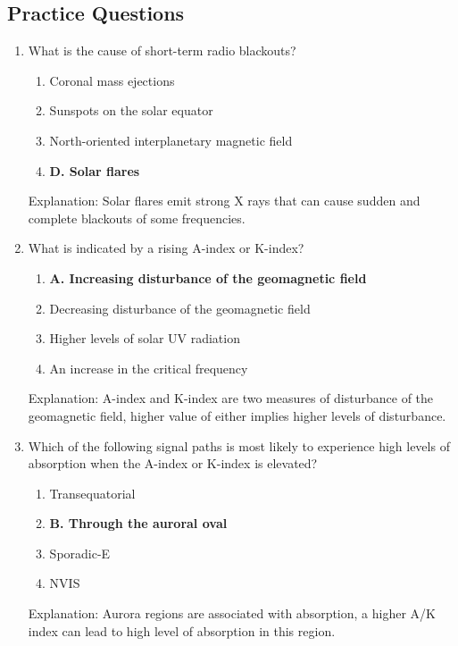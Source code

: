 \subsection*{Practice Questions}
\begin{enumerate}
    \item What is the cause of short-term radio blackouts?
        \begin{enumerate}
          \item  Coronal mass ejections
       \item  Sunspots on the solar equator
      \item  North-oriented interplanetary magnetic field
         \item \textbf{D. Solar flares}
     \end{enumerate}
    \textcolor{myred}{Explanation:}
     Solar flares emit strong X rays that can cause sudden and complete blackouts of some frequencies.
     
   \item What is indicated by a rising A-index or K-index?
         \begin{enumerate}
        \item \textbf{A. Increasing disturbance of the geomagnetic field}
        \item  Decreasing disturbance of the geomagnetic field
       \item  Higher levels of solar UV radiation
        \item  An increase in the critical frequency
    \end{enumerate}
     \textcolor{myred}{Explanation:}
     A-index and K-index are two measures of disturbance of the geomagnetic field, higher value of either implies higher levels of disturbance.

        \item Which of the following signal paths is most likely to experience high levels of absorption when the A-index or K-index is elevated?
        \begin{enumerate}
      \item  Transequatorial
       \item \textbf{B. Through the auroral oval}
       \item  Sporadic-E
       \item  NVIS
        \end{enumerate}
    \textcolor{myred}{Explanation:}
   Aurora regions are associated with absorption, a higher A/K index can lead to high level of absorption in this region.
        

\end{enumerate}
